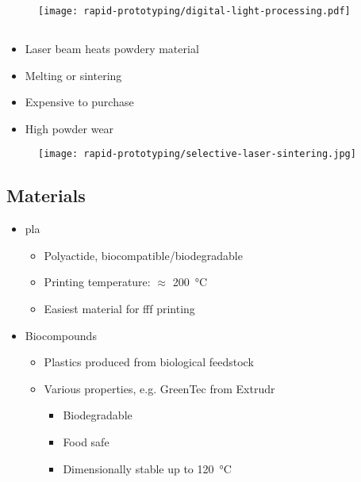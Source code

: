 \documentclass[aspectratio=169]{beamer}
\begin{document}
\begin{frame}
    \begin{figure}
        \texttt{[image: rapid-prototyping/digital-light-processing.pdf]}
        \caption{}
    \end{figure}
\end{frame}

\subsection{}

\begin{frame}
    \begin{itemize}
        \item Laser beam heats powdery material
        \item Melting or sintering
        \item Expensive to purchase
        \item High powder wear
    \end{itemize}
    \begin{figure}
        \texttt{[image: rapid-prototyping/selective-laser-sintering.jpg]}
        \caption{}
    \end{figure}
\end{frame}

\subsection{Materials}
\begin{frame}
    \begin{itemize}
        \item \acs{pla}
              \begin{itemize}
                  \item Polyactide, biocompatible/biodegradable
                  \item Printing temperature: $\approx$ \SI{200}{\celsius}
                  \item Easiest material for \acs{fff} printing
              \end{itemize}
        \item Biocompounds
              \begin{itemize}
                  \item Plastics produced from biological feedstock
                  \item Various properties, e.g. GreenTec from Extrudr
                        \begin{itemize}
                            \item Biodegradable
                            \item Food safe
                            \item Dimensionally stable up to \SI{120}{\celsius}
                        \end{itemize}
              \end{itemize}
    \end{itemize}
\end{frame}
\end{document}
